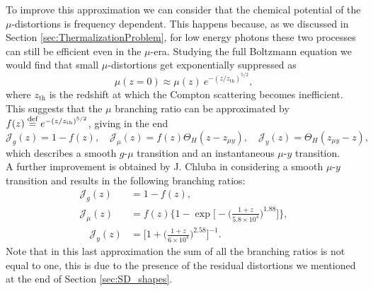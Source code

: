 To improve this approximation we can consider that the chemical potential of the $\mu$-distortions is frequency dependent. This happens because, as we discussed in Section \ref{sec:ThermalizationProblem}, for low energy photons these two processes can still be efficient even in the $\mu$-era. Studying the full Boltzmann equation we would find that small $\mu$-distortions get exponentially suppressed as \cite{Danese_82} 
\begin{equation}
    \label{eq:SD_mu_freq}
    \mu(z=0)\approx\mu(z)\ e^{-(z/z_{\text{th}})^{5/2}},
\end{equation}
where $z_{\text{th}}$ is the redshift at which the Compton scattering becomes inefficient. This suggests that the $\mu$ branching ratio can be approximated by $f(z)\stackrel{\text{def}}{=} e^{-(z/z_{\text{th}})^{5/2}}$, giving in the end
\begin{equation}
    \mathcal{J}_g(z)=1-f(z),\quad \mathcal{J}_\mu(z)=f(z)\Theta_{H}(z-z_{\mu y}),\quad \mathcal{J}_y(z)=\Theta_{H}(z_{\mu y}-z), \label{eq:BR_soft}
\end{equation}
which describes a smooth $g$-$\mu$ transition and an instantaneous $\mu$-$ y$ transition.\\A further improvement is obtained by J. Chluba in \cite{Chluba_Green} considering a smooth $\mu$-$ y$ transition and results in the following branching ratios:
\begin{align}
    \mathcal{J}_g(z)&=1-f(z),\\ \mathcal{J}_\mu(z)&=f(z)\Bigg\{1-\exp\Bigg[-\bigg(\frac{1+z}{5.8\times10^4}\bigg)^{1.88}\Bigg]\Bigg\},\\\quad \mathcal{J}_y(z)&=\Bigg[1+\bigg(\frac{1+z}{6\times10^{4}}\bigg)^{2.58}\Bigg]^{-1}.
\end{align}
Note that in this last approximation the sum of all the branching ratios is not equal to one, this is due to the presence of the residual distortions we mentioned at the end of Section \ref{sec:SD_shapes}. 

